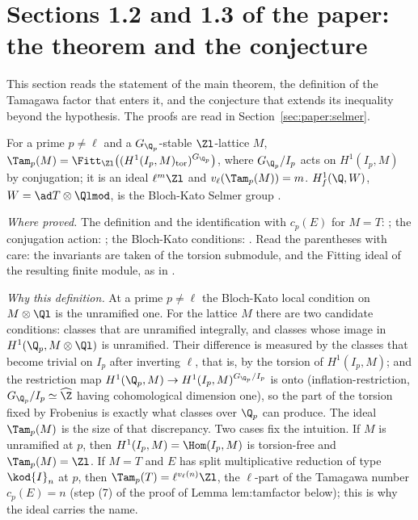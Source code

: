 \begin{sloppypar}
\section[Paper 1.2, 1.3: theorem and conjecture]{Sections 1.2 and 1.3 of the paper: the theorem and the conjecture}\label{sec:paper:main-statements}

This section reads the statement of the main theorem, the definition of the Tamagawa factor that enters it, and the conjecture that extends its
inequality beyond the hypothesis. The proofs are read in Section~\ref{sec:paper:selmer}.

\begin{definition}\label{def:paper:tamagawa}
For a prime $p\ne\ell$ and a $G_{\Q_p}$-stable $\Zl$-lattice $M$, $\Tam_p(M)=\Fitt_{\Zl}\bigl((H^1(I_p,M)_{\mathrm{tor}})^{G_{\Q_p}}\bigr)$, where $G_{\Q_p}/I_p$ acts on $H^1(I_p,M)$ by
conjugation; it is an ideal $\ell^m\Zl$ and $v_\ell(\Tam_p(M))=m$. $H^1_f(\Q,W)$, $W=\ad T\otimes\Qlmod$, is the Bloch-Kato Selmer group \cite[Section 2.1]{DFG04}.
\end{definition}

\noindent\emph{Where proved.} The definition and the identification with $c_p(E)$ for $M=T$: ; the conjugation action: ; the
Bloch-Kato conditions: . Read the parentheses with care: the invariants are taken of the torsion submodule, and the Fitting ideal of
the resulting finite module, as in \cite[I.4.2.2]{FPR94}.

\emph{Why this definition.} At a prime $p\ne\ell$ the Bloch-Kato local condition on $M\otimes\Ql$ is the unramified one. For the lattice $M$ there are two candidate conditions:
classes that are unramified integrally, and classes whose image in $H^1(\Q_p,M\otimes\Ql)$ is unramified. Their difference is measured by the classes that become trivial on $I_p$
after inverting $\ell$, that is, by the torsion of $H^1(I_p,M)$; and the restriction map $H^1(\Q_p,M)\to H^1(I_p,M)^{G_{\Q_p}/I_p}$ is onto (inflation-restriction, $G_{\Q_p}/I_p\simeq\widehat\Z$
having cohomological dimension one), so the part of the torsion fixed by Frobenius is exactly what classes over $\Q_p$ can produce. The ideal $\Tam_p(M)$ is the size
of that discrepancy. Two cases fix the intuition. If $M$ is unramified at $p$, then $H^1(I_p,M)=\Hom(I_p,M)$ is torsion-free and $\Tam_p(M)=\Zl$. If $M=T$ and $E$ has split
multiplicative reduction of type $\kod{I}_n$ at $p$, then $\Tam_p(T)=\ell^{v_\ell(n)}\Zl$, the $\ell$-part of the Tamagawa number $c_p(E)=n$ (step (7) of the proof of
Lemma lem:tamfactor below); this is why the ideal carries the name.


\end{sloppypar}
